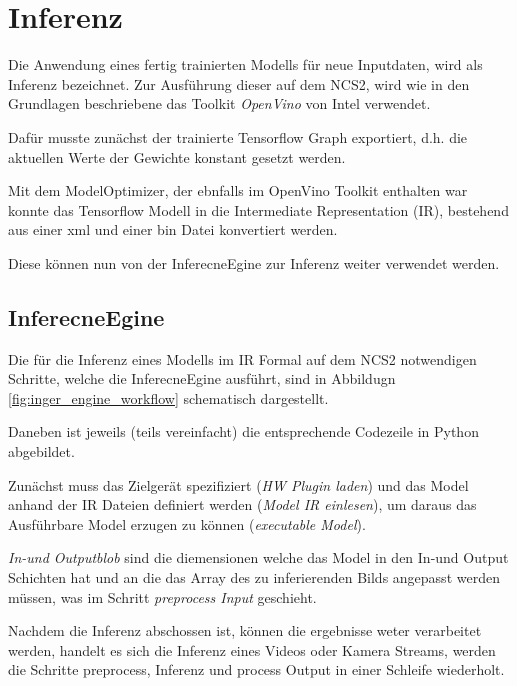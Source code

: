 \section{Inferenz}\label{sec:inferenz}

Die Anwendung eines fertig trainierten Modells für 
neue Inputdaten, wird als Inferenz bezeichnet.
Zur Ausführung dieser auf dem NCS2, wird wie in 
den Grundlagen beschriebene das Toolkit \textit{OpenVino}
von Intel verwendet.

Dafür musste zunächst der trainierte Tensorflow Graph 
exportiert, d.h. die aktuellen Werte der Gewichte 
konstant gesetzt werden.

Mit dem ModelOptimizer, der ebnfalls im OpenVino 
Toolkit enthalten war konnte das Tensorflow Modell 
in die Intermediate Representation (IR), bestehend 
aus einer xml und einer bin Datei konvertiert werden.


Diese können nun von der InferecneEgine zur Inferenz weiter 
verwendet werden.


\subsection*{InferecneEgine}


Die für die Inferenz eines Modells im IR Formal 
auf dem NCS2 notwendigen Schritte, welche die
 InferecneEgine ausführt, sind in Abbildugn
\ref{fig:inger_engine_workflow} schematisch dargestellt.

Daneben ist jeweils (teils vereinfacht) die entsprechende 
Codezeile in Python abgebildet.

Zunächst muss das Zielgerät spezifiziert (\textit{HW Plugin laden})
und das Model anhand der IR Dateien definiert werden
(\textit{Model IR einlesen}), um daraus 
das Ausführbare Model erzugen zu können (\textit{executable Model}).

\textit{In-und Outputblob} sind die diemensionen welche
das Model in den In-und Output Schichten hat
und an die das Array des zu inferierenden 
Bilds angepasst werden müssen, was im Schritt 
\textit{preprocess Input} geschieht.

Nachdem die Inferenz abschossen ist, können die 
ergebnisse weter verarbeitet werden, handelt es sich 
die Inferenz eines Videos oder Kamera Streams, 
werden die Schritte preprocess, Inferenz und 
process Output in einer Schleife wiederholt.


